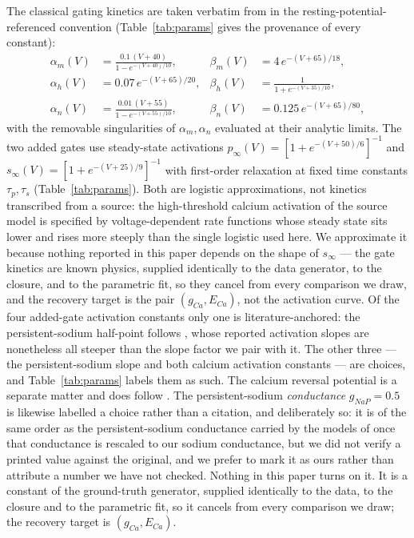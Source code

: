 \documentclass{article}
\newcommand{\mgNaP}{0.5}\newcommand{\mECa}{120}\newcommand{\mIapp}{10}
\begin{document}
The classical gating kinetics are taken verbatim from \citet{hodgkin1952} in the
resting-potential-referenced convention (Table~\ref{tab:params} gives the
provenance of every constant):
\begin{align*}
  \alpha_m(V) &= \frac{0.1\,(V+40)}{1-e^{-(V+40)/10}}, &  %
  \beta_m(V)  &= 4\,e^{-(V+65)/18}, \\                    %
  \alpha_h(V) &= 0.07\,e^{-(V+65)/20}, &                  %
  \beta_h(V)  &= \frac{1}{1+e^{-(V+35)/10}}, \\           %
  \alpha_n(V) &= \frac{0.01\,(V+55)}{1-e^{-(V+55)/10}}, & %
  \beta_n(V)  &= 0.125\,e^{-(V+65)/80},                   %
\end{align*}
with the removable singularities of $\alpha_m,\alpha_n$ evaluated at their
analytic limits. The two added gates use steady-state activations $p_\infty(V) = [1+e^{-(V+50)/6}]^{-1}$ and $s_\infty(V) = [1+e^{-(V+25)/9}]^{-1}$ %
with first-order relaxation at fixed time constants $\tau_p,\tau_s$
(Table~\ref{tab:params}). Both are logistic approximations, not kinetics transcribed from a source: the high-threshold calcium activation of the source model \citep{reuveni1993} is specified by voltage-dependent rate functions whose steady state sits lower and rises more steeply than the single logistic used here. We approximate it because nothing reported in this paper depends on the shape of $s_\infty$ --- the gate kinetics are known physics, supplied identically to the data generator, to the closure, and to the parametric fit, so they cancel from every comparison we draw, and the recovery target is the pair $(g_{Ca},E_{Ca})$, not the activation curve. Of the four added-gate activation constants only one is literature-anchored: the persistent-sodium half-point follows
\citet{magistretti1999}, whose reported activation slopes are nonetheless all steeper than the slope factor we pair with it. The other three --- the persistent-sodium slope and both calcium activation constants --- are choices, and Table~\ref{tab:params} labels them as such. The calcium reversal potential is a separate matter and does follow
\citet{reuveni1993}.
The persistent-sodium \emph{conductance} $g_{NaP}=\mgNaP$ is likewise labelled a
choice rather than a citation, and deliberately so: it is of the same order as
the persistent-sodium conductance carried by the models of \citet{golomb1997}
once that conductance is rescaled to our sodium conductance, but we did not
verify a printed value against the original, and we prefer to mark it as ours
rather than attribute a number we have not checked. Nothing in this paper turns
on it. It is a constant of the ground-truth generator, supplied identically to
the data, to the closure and to the parametric fit, so it cancels from every
comparison we draw; the recovery target is $(g_{Ca}, E_{Ca})$.
\end{document}
